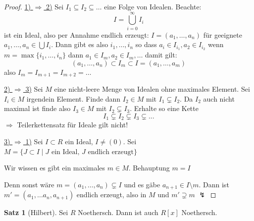 \documentclass[12pt,parskip=full]{scrartcl}
\newcommand{\heading}{\underline}
\theoremstyle{definition}
\newtheorem{theorem}{Satz}[section]
\theoremstyle{remark}
\begin{document}
	\begin{proof}
		\heading{1) $\Rightarrow$ 2)}
		Sei $I_1 \subseteq I_2 \subseteq \dots$ eine Folge von Idealen. Beachte:
		\begin{equation*}
			I = \bigcup_{i=0}^\infty I_i
		\end{equation*}
		ist ein Ideal, also per Annahme endlich erzeugt: $I = (a_1, \dots, a_n)$ für geeignete $a_1, \dots, a_n \in \bigcup I_i$. Dann gibt es also $i_1, \dots, i_n$ so dass $a_i \in I_{i_1}, a_2 \in I_{i_2}$ wenn $m = \max \{ i_1, \dots, i_n \}$ dann $a_1 \in I_m, a_2 \in I_m, \dots$ damit gilt:
		\begin{equation*}
			(a_1, \dots, a_n) \subset I_m \subset I = (a_1, \dots, a_m)
		\end{equation*}
		also $I_m = I_{m+1} = I_{m+2} = \dots$
		
		\heading{2) $\Rightarrow$ 3)}
		Sei $M$ eine nicht-leere Menge von Idealen ohne maximales Element. Sei $I_i \in M$ irgendein Element. Finde dann $I_2 \in M$ mit $I_1 \subsetneq I_2$. Da $I_2$ auch nicht maximal ist finde also $I_3 \in M$ mit $I_2 \subsetneq I_3$. Erhalte so eine Kette
		\begin{equation*}
			I_1 \subsetneq I_2 \subsetneq I_3 \subsetneq ...
		\end{equation*}
		$\Rightarrow$ Teilerkettensatz für Ideale gilt nicht!
		
		\heading{3) $\Rightarrow$ 1)}
		Sei $I \subset R$ ein Ideal, $I \neq (0)$. Sei $M = \{ J \subset I \mid \text{$J$ ein Ideal, $J$ endlich erzeugt} \}$
		
		Wir wissen es gibt ein maximales $m \in M$. Behauptung $m = I$
		
		Denn sonst wäre $m = (a_1, \dots, a_n) \subsetneq I$ und es gäbe $a_{n+1} \in I \setminus m$. Dann ist $m' = (a_1, \dots a_n, a_{n+1})$ endlich erzeugt, also in $M$ und $m' \supsetneq m$ $\lightning$
	\end{proof}

	\begin{theorem}[Hilbert]
		Sei $R$ Noethersch. Dann ist auch $R[x]$ Noethersch.
	\end{theorem}
\end{document}
